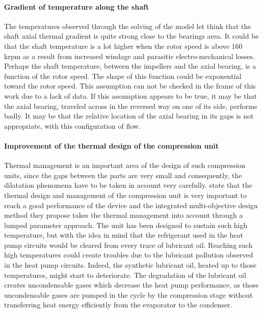 \paragraph{Gradient of temperature along the shaft}

The temperatures observed through the solving of the \AWP{} model let
think that the shaft axial thermal gradient is quite strong close to
the bearings area. It could be that the shaft temperature is a lot
higher when the rotor speed is above 160 krpm as a result from
increased windage and parasitic electro-mechanical losses. Perhaps the
shaft temperature, between the impellers and the axial bearing, is a
function of the rotor speed. The shape of this function could be
exponential toward the rotor speed. This assumption can not be checked
in the frame of this work due to a lack of data. If this assumption
appears to be true, it may be that the axial bearing, traveled across
in the reversed way on one of its side, performs badly. It may be that
the relative location of the axial bearing in its gaps is not
appropriate, with this configuration of flow.


\paragraph{Improvement of the thermal design of the
  compression unit}

Thermal management is an important area of the design of such
compression units, since the gaps between the parts are very small and
consequently, the dilatation phenomena have to be taken in account
very carefully. \citet[p.\,3]{Schiffmann-Favrat-2010b} state that the
thermal design and management of the compression unit is very
important to reach a good performance of the device and the integrated
multi-objective design method they propose takes the thermal
management into account through a lumped parameter approach. The unit
has been designed to sustain such high temperature, but with the idea
in mind that the refrigerant used in the heat pump circuits would be
cleared from every trace of lubricant oil. Reaching such high
temperatures could create troubles due to the lubricant pollution
observed in the heat pump circuits. Indeed, the synthetic
lubricant oil, heated up to those temperatures, might start to
deteriorate. The degradation of the lubricant oil creates
uncondensable gases which decrease the heat pump performance, as
those uncondensable gases are pumped in the cycle by the compression
stage without transferring heat energy efficiently from the evaporator
to the condenser.

